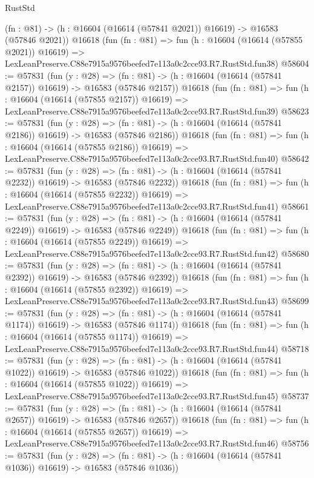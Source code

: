 \begin{lexlean}{RustStd}
\begin{coremodule}
    (fn : @81) -> (h : @16604 (@16614 (@57841 @2021)) @16619) -> @16583 (@57846 @2021))
    @16618
    (fun (fn : @81) =>
    fun (h : @16604 (@16614 (@57855 @2021)) @16619) =>
    LexLeanPreserve.C88e7915a9576beefed7e113a0c2cce93.R7.RustStd.fun38)
@58604 := @57831
    (fun (y : @28) =>
    (fn : @81) -> (h : @16604 (@16614 (@57841 @2157)) @16619) -> @16583 (@57846 @2157))
    @16618
    (fun (fn : @81) =>
    fun (h : @16604 (@16614 (@57855 @2157)) @16619) =>
    LexLeanPreserve.C88e7915a9576beefed7e113a0c2cce93.R7.RustStd.fun39)
@58623 := @57831
    (fun (y : @28) =>
    (fn : @81) -> (h : @16604 (@16614 (@57841 @2186)) @16619) -> @16583 (@57846 @2186))
    @16618
    (fun (fn : @81) =>
    fun (h : @16604 (@16614 (@57855 @2186)) @16619) =>
    LexLeanPreserve.C88e7915a9576beefed7e113a0c2cce93.R7.RustStd.fun40)
@58642 := @57831
    (fun (y : @28) =>
    (fn : @81) -> (h : @16604 (@16614 (@57841 @2232)) @16619) -> @16583 (@57846 @2232))
    @16618
    (fun (fn : @81) =>
    fun (h : @16604 (@16614 (@57855 @2232)) @16619) =>
    LexLeanPreserve.C88e7915a9576beefed7e113a0c2cce93.R7.RustStd.fun41)
@58661 := @57831
    (fun (y : @28) =>
    (fn : @81) -> (h : @16604 (@16614 (@57841 @2249)) @16619) -> @16583 (@57846 @2249))
    @16618
    (fun (fn : @81) =>
    fun (h : @16604 (@16614 (@57855 @2249)) @16619) =>
    LexLeanPreserve.C88e7915a9576beefed7e113a0c2cce93.R7.RustStd.fun42)
@58680 := @57831
    (fun (y : @28) =>
    (fn : @81) -> (h : @16604 (@16614 (@57841 @2392)) @16619) -> @16583 (@57846 @2392))
    @16618
    (fun (fn : @81) =>
    fun (h : @16604 (@16614 (@57855 @2392)) @16619) =>
    LexLeanPreserve.C88e7915a9576beefed7e113a0c2cce93.R7.RustStd.fun43)
@58699 := @57831
    (fun (y : @28) =>
    (fn : @81) -> (h : @16604 (@16614 (@57841 @1174)) @16619) -> @16583 (@57846 @1174))
    @16618
    (fun (fn : @81) =>
    fun (h : @16604 (@16614 (@57855 @1174)) @16619) =>
    LexLeanPreserve.C88e7915a9576beefed7e113a0c2cce93.R7.RustStd.fun44)
@58718 := @57831
    (fun (y : @28) =>
    (fn : @81) -> (h : @16604 (@16614 (@57841 @1022)) @16619) -> @16583 (@57846 @1022))
    @16618
    (fun (fn : @81) =>
    fun (h : @16604 (@16614 (@57855 @1022)) @16619) =>
    LexLeanPreserve.C88e7915a9576beefed7e113a0c2cce93.R7.RustStd.fun45)
@58737 := @57831
    (fun (y : @28) =>
    (fn : @81) -> (h : @16604 (@16614 (@57841 @2657)) @16619) -> @16583 (@57846 @2657))
    @16618
    (fun (fn : @81) =>
    fun (h : @16604 (@16614 (@57855 @2657)) @16619) =>
    LexLeanPreserve.C88e7915a9576beefed7e113a0c2cce93.R7.RustStd.fun46)
@58756 := @57831
    (fun (y : @28) =>
    (fn : @81) -> (h : @16604 (@16614 (@57841 @1036)) @16619) -> @16583 (@57846 @1036))

\end{coremodule}
\end{lexlean}
